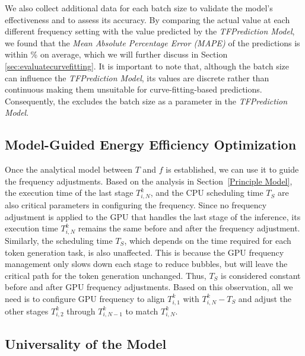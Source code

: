 We also collect additional data for each batch size to validate the model's effectiveness and to assess its accuracy. By comparing the actual value at each different frequency setting with the value predicted by the \textit{TFPrediction Model}, we found that the \emph{Mean Absolute Percentage
Error (MAPE)} of the predictions is within \% on average, which we will further discuss in Section \ref{sec:evaluatecurvefitting}.
It is important to note that, although the batch size can influence the \textit{TFPrediction Model}, its values are discrete rather than continuous making them unsuitable for curve-fitting-based predictions. 
Consequently, the \thisproj{} excludes the batch size as a parameter in the \textit{TFPrediction Model}.



\subsection{Model-Guided Energy Efficiency Optimization}
\label{sec:guide}

Once the analytical model between $T$ and $f$ is established, we can use it to guide the frequency adjustments. 
Based on the analysis in Section~\ref{Principle Model}, the execution time of the last stage $T_{i,N}^{k}$, and the CPU scheduling time $T_S$ are also critical parameters in configuring the frequency.
Since no frequency adjustment is applied to the GPU that handles the last stage of the inference, its execution time $T_{i,N}^{k}$ remains the same before and after the frequency adjustment.
Similarly, the scheduling time $T_S$, which depends on the time required for each token generation task, is also unaffected. 
This is because the GPU frequency management only slows down each stage to reduce bubbles, but will leave the critical path for the token generation unchanged. 
Thus, $T_S$ is considered constant before and after GPU frequency adjustments.
Based on this observation, all we need is to configure GPU frequency to align $T_{i,1}^{k}$ with $T_{i,N}^{k} - T_S$ and adjust the other stages $T_{i,2}^{k}$ through $T_{i,N-1}^{k}$ to match $T_{i,N}^{k}$.



\subsection{Universality of the Model}
\label{sec:modelportable}


